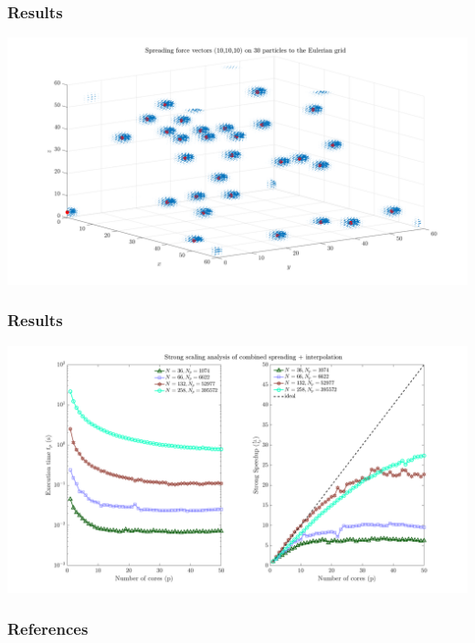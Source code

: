 \documentclass[10pt]{beamer}
\begin{document}
\begin{frame}
\frametitle{Results}
\includegraphics[width=\columnwidth]{./Figures/spread}
\end{frame}
\begin{frame}
\frametitle{Results}
\includegraphics[width=\columnwidth]{./Figures/speedup}
\end{frame}

\begin{frame}
\frametitle{References}
\cite{mcqueen}


\end{frame}
\end{document}
